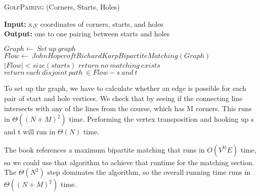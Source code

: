 \documentclass{article}
\begin{document}
\begin{algorithm} \caption{\textsc{GolfPairing} (Corners, Starts, Holes)}\label{alg:seb}
    {\bf Input:} x,y coordinates of corners, starts, and holes\\
    {\bf Output:} one to one pairing between starts and holes
    \begin{algorithmic}[1]
        \State$Graph \gets\ Set\ up\ graph$
	\State$Flow \gets\ JohnHopcroftRichardKarpBipartiteMatching(Graph)$
	\If$|Flow| < size(starts)$
		\State$return\ no\ matching\ exists$
	\EndIf{}
	\State$return\ each\ disjoint\ path\ \in Flow - s\ and\ t$
    \end{algorithmic}
\end{algorithm}

To set up the graph, we have to calculate whether an edge is possible for each pair of start and hole vertices. We check that by seeing if the connecting line intersects with any of the lines from the course, which has M corners. This runs in $\Theta((N+M)^2)$ time. Performing the vertex transposition and hooking up s and t will run in $\Theta(N)$ time.

The book references a maximum bipartite matching that runs in $O( V^{½} E)$ time, so we could use that algorithm to achieve that runtime for the matching section. The $\Theta(N^2)$ step dominates the algorithm, so the overall running time runs in $\Theta((N+M)^2)$ time.
\end{document}
